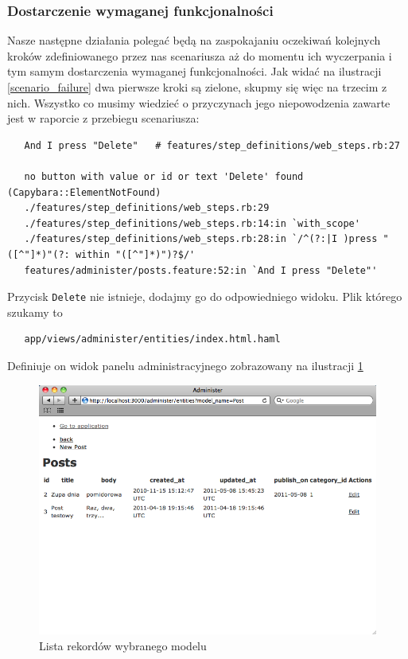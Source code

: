    \subsubsection{Dostarczenie wymaganej funkcjonalności}
   
   Nasze następne działania polegać będą na zaspokajaniu oczekiwań kolejnych kroków zdefiniowanego przez nas scenariusza aż do momentu ich wyczerpania i tym samym dostarczenia wymaganej funkcjonalności. Jak widać na ilustracji \ref{scenario_failure} dwa pierwsze kroki są zielone, skupmy się więc na trzecim z nich. Wszystko co musimy wiedzieć o przyczynach jego niepowodzenia zawarte jest w raporcie z przebiegu scenariusza:
   
   \begin{lstlisting}
   And I press "Delete"   # features/step_definitions/web_steps.rb:27
   
   no button with value or id or text 'Delete' found (Capybara::ElementNotFound)
   ./features/step_definitions/web_steps.rb:29
   ./features/step_definitions/web_steps.rb:14:in `with_scope'
   ./features/step_definitions/web_steps.rb:28:in `/^(?:|I )press "([^"]*)"(?: within "([^"]*)")?$/'
   features/administer/posts.feature:52:in `And I press "Delete"'
   \end{lstlisting}
   
   Przycisk \verb+Delete+ nie istnieje, dodajmy go do odpowiedniego widoku. Plik którego szukamy to 
   
   \begin{lstlisting}
   app/views/administer/entities/index.html.haml
   \end{lstlisting}
   
   Definiuje on widok panelu administracyjnego zobrazowany na ilustracji \ref{administer_index}
   
   \clearpage
   
    \begin{figure}[!h]
  		\begin{center}
  			\includegraphics[width=\linewidth]{images/administer_index.png}
  			\caption{Lista rekordów wybranego modelu}
  			\label{administer_index}
  		\end{center}
  	\end{figure}
  	
